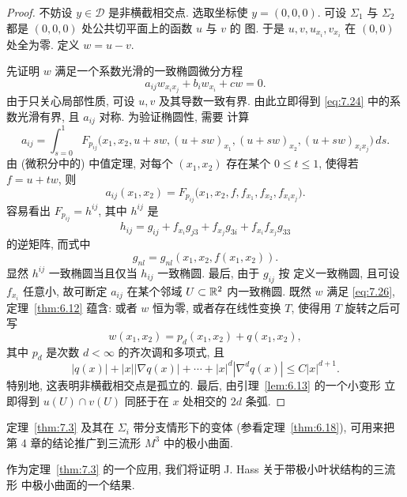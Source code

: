 \begin{proof}
不妨设 $y\in\mathcal{D}$ 是非横截相交点. 选取坐标使 $y=(0,0,0)$. 可设
$\Sigma_1$ 与 $\Sigma_2$ 都是 $(0,0,0)$ 处公共切平面上的函数 $u$ 与 $v$ 的
图. 于是 $u,v,u_{x_i},v_{x_i}$ 在 $(0,0)$ 处全为零. 定义 $w=u-v$.

先证明 $w$ 满足一个系数光滑的一致椭圆微分方程
\begin{equation}
a_{ij}w_{x_ix_j}+b_iw_{x_i}+cw=0.
\label{eq:7.26}
\end{equation}
由于只关心局部性质, 可设 $u,v$ 及其导数一致有界. 由此立即得到
\eqref{eq:7.24} 中的系数光滑有界, 且 $a_{ij}$ 对称. 为验证椭圆性, 需要
计算
\begin{equation}
a_{ij}=\int_{s=0}^1F_{p_{ij}}\bigl(x_1,x_2,u+sw,(u+sw)_{x_1},
(u+sw)_{x_2},(u+sw)_{x_ix_j}\bigr)\,ds.
\label{eq:7.27}
\end{equation}
由 (微积分中的) 中值定理, 对每个 $(x_1,x_2)$ 存在某个 $0\leq t\leq1$,
使得若 $f=u+tw$, 则
\begin{equation}
a_{ij}(x_1,x_2)=F_{p_{ij}}\bigl(x_1,x_2,f,f_{x_1},f_{x_2},
f_{x_ix_j}\bigr).
\label{eq:7.28}
\end{equation}
容易看出 $F_{p_{ij}}=h^{ij}$, 其中 $h^{ij}$ 是
\begin{equation}
h_{ij}=g_{ij}+f_{x_i}g_{j3}+f_{x_j}g_{3i}+f_{x_i}f_{x_j}g_{33}
\label{eq:7.29}
\end{equation}
的逆矩阵, 而式中
\[
g_{nl}=g_{nl}(x_1,x_2,f(x_1,x_2)).
\]
显然 $h^{ij}$ 一致椭圆当且仅当 $h_{ij}$ 一致椭圆. 最后, 由于 $g_{ij}$ 按
定义一致椭圆, 且可设 $f_{x_i}$ 任意小, 故可断定 $a_{ij}$ 在某个邻域
$U\subset\mathbb{R}^2$ 内一致椭圆. 既然 $w$ 满足 \eqref{eq:7.26}, 定理~\ref{thm:6.12} 蕴含:
或者 $w$ 恒为零, 或者存在线性变换 $T$, 使得用 $T$ 旋转之后可写
\begin{equation}
w(x_1,x_2)=p_d(x_1,x_2)+q(x_1,x_2),
\label{eq:7.30}
\end{equation}
其中 $p_d$ 是次数 $d<\infty$ 的齐次调和多项式, 且
\begin{equation}
|q(x)|+|x||\nabla q(x)|+\cdots+|x|^d|\nabla^dq(x)|\leq C|x|^{d+1}.
\label{eq:7.31}
\end{equation}
特别地, 这表明非横截相交点是孤立的. 最后, 由引理~\ref{lem:6.13} 的一个小变形
立即得到 $u(U)\cap v(U)$ 同胚于在 $x$ 处相交的 $2d$ 条弧.
\end{proof}

定理~\ref{thm:7.3} 及其在 $\Sigma_i$ 带分支情形下的变体 (参看定理~\ref{thm:6.18}), 可用来把
第 4 章的结论推广到三流形 $M^3$ 中的极小曲面.

作为定理~\ref{thm:7.3} 的一个应用, 我们将证明 J. Hass 关于带极小叶状结构的三流形
中极小曲面的一个结果.

